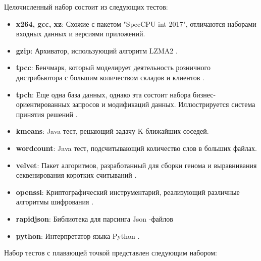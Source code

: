 Целочисленный набор состоит из следующих тестов:
\begin{itemize}
	\item  \textbf{x264, gcc, xz}: Схожие с пакетом "SpecCPU int 2017"\phantom{}, отличаются наборами входных данных и версиями приложений.
	\item  \textbf{gzip}: Архиватор, использующий алгоритм LZMA2 \cite{akoguz2016comparison}.
	\item  \textbf{tpcc}: Бенчмарк, который моделирует  деятельность розничного дистрибьютора с большим количеством складов и клиентов \cite{leutenegger1993modeling}.
	\item  \textbf{tpch}: Еще одна база данных, однако эта состоит набора бизнес-ориентированных запросов и модификаций данных. Иллюстрируется система принятия решений \cite{barata2015overview}.
	\item  \textbf{kmeans}: Java тест, решающий задачу K-ближайших соседей.
	\item  \textbf{wordcount}: Java тест, подсчитывающий количество слов в больших файлах. 
	\item  \textbf{velvet}: Пакет алгоритмов, разработанный для сборки генома и выравнивания секвенирования коротких считываний \cite{zerbino2008velvet}. 
	\item  \textbf{openssl}: Криптографический инструментарий, реализующий различные алгоритмы шифрования \cite{rescorla2001introduction}.
	\item  \textbf{rapidjson}: Библиотека для парсинга Json -файлов\cite{keiser2023demand}
	\item  \textbf{python}: Интерпретатор языка Python \cite{python2021python}.
\end{itemize}
Набор тестов с плавающей точкой представлен следующим набором:
